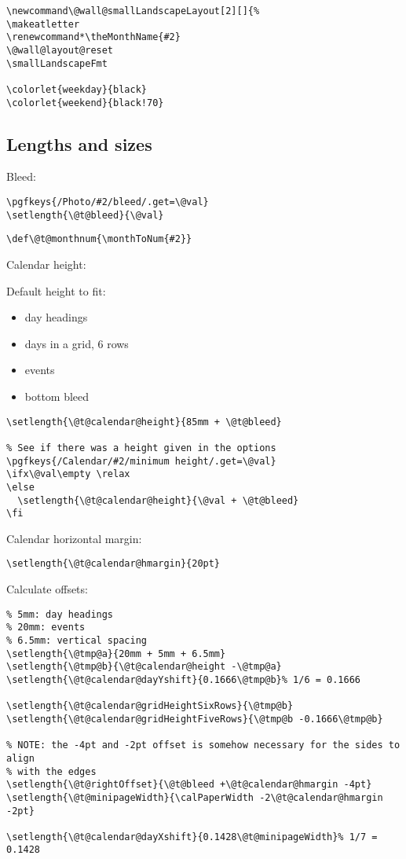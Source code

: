 \documentclass[11pt,oneside]{memoir-article}
\begin{document}
\begin{verbatim}
\newcommand\@wall@smallLandscapeLayout[2][]{%
\makeatletter
\renewcommand*\theMonthName{#2}
\@wall@layout@reset
\smallLandscapeFmt

\colorlet{weekday}{black}
\colorlet{weekend}{black!70}
\end{verbatim}

\subsection{Lengths and sizes}
\label{sec-10-5-3}

Bleed:

\begin{verbatim}
\pgfkeys{/Photo/#2/bleed/.get=\@val}
\setlength{\@t@bleed}{\@val}
\end{verbatim}

\begin{verbatim}
\def\@t@monthnum{\monthToNum{#2}}
\end{verbatim}

Calendar height:

Default height to fit:

\begin{itemize}
\item day headings
\item days in a grid, 6 rows
\item events
\item bottom bleed
\end{itemize}

\begin{verbatim}
\setlength{\@t@calendar@height}{85mm + \@t@bleed}

% See if there was a height given in the options
\pgfkeys{/Calendar/#2/minimum height/.get=\@val}
\ifx\@val\empty \relax
\else
  \setlength{\@t@calendar@height}{\@val + \@t@bleed}
\fi
\end{verbatim}

Calendar horizontal margin:

\begin{verbatim}
\setlength{\@t@calendar@hmargin}{20pt}
\end{verbatim}

Calculate offsets:

\begin{verbatim}
% 5mm: day headings
% 20mm: events
% 6.5mm: vertical spacing
\setlength{\@tmp@a}{20mm + 5mm + 6.5mm}
\setlength{\@tmp@b}{\@t@calendar@height -\@tmp@a}
\setlength{\@t@calendar@dayYshift}{0.1666\@tmp@b}% 1/6 = 0.1666

\setlength{\@t@calendar@gridHeightSixRows}{\@tmp@b}
\setlength{\@t@calendar@gridHeightFiveRows}{\@tmp@b -0.1666\@tmp@b}

% NOTE: the -4pt and -2pt offset is somehow necessary for the sides to align
% with the edges
\setlength{\@t@rightOffset}{\@t@bleed +\@t@calendar@hmargin -4pt}
\setlength{\@t@minipageWidth}{\calPaperWidth -2\@t@calendar@hmargin -2pt}

\setlength{\@t@calendar@dayXshift}{0.1428\@t@minipageWidth}% 1/7 = 0.1428
\end{verbatim}
\end{document}
